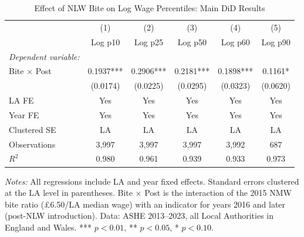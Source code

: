 \begin{table}[htbp]
\centering
\caption{Effect of NLW Bite on Log Wage Percentiles: Main DiD Results}
\label{tab:main}
\small
\begin{tabular}{lccccc}
\hline\hline
 & (1) & (2) & (3) & (4) & (5) \\
 & Log p10 & Log p25 & Log p50 & Log p60 & Log p90 \\
\hline
\textit{Dependent variable:} & & & & & \\
Bite $\times$ Post  & 0.1937*** & 0.2906*** & 0.2181*** & 0.1898*** & 0.1161* \\
 & (0.0174) & (0.0225) & (0.0295) & (0.0323) & (0.0620) \\
\hline
LA FE           & Yes & Yes & Yes & Yes & Yes \\
Year FE         & Yes & Yes & Yes & Yes & Yes \\
Clustered SE    & LA  & LA  & LA  & LA  & LA  \\
Observations    & 3,997 & 3,997 & 3,997 & 3,992 & 687 \\
$R^2$           & 0.980 & 0.961 & 0.939 & 0.933 & 0.973 \\
\hline\hline
\end{tabular}
\raggedright\footnotesize\textit{Notes:} All regressions include LA and year fixed effects. Standard errors clustered at the LA level in parentheses. Bite $\times$ Post is the interaction of the 2015 NMW bite ratio (£6.50/LA median wage) with an indicator for years 2016 and later (post-NLW introduction). Data: ASHE 2013--2023, all Local Authorities in England and Wales. *** $p<0.01$, ** $p<0.05$, * $p<0.10$.
\end{table}
